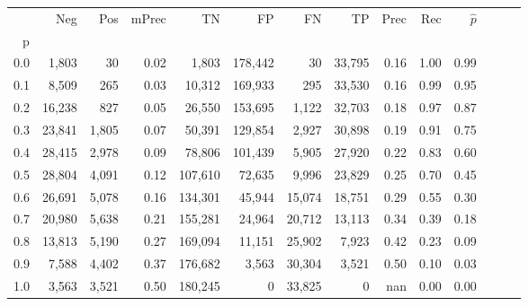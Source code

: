 \begin{tabular}{rrrrrrrrrrrrrr}
\toprule
{} &     Neg &    Pos & mPrec &       TN &       FP &      FN &      TP &  Prec &   Rec & $\hat{p}$ \\
p   &         &        &       &          &          &         &         &       &       &           \\
\midrule
0.0 &   1,803 &     30 &  0.02 &    1,803 &  178,442 &      30 &  33,795 &  0.16 &  1.00 &      0.99 \\
0.1 &   8,509 &    265 &  0.03 &   10,312 &  169,933 &     295 &  33,530 &  0.16 &  0.99 &      0.95 \\
0.2 &  16,238 &    827 &  0.05 &   26,550 &  153,695 &   1,122 &  32,703 &  0.18 &  0.97 &      0.87 \\
0.3 &  23,841 &  1,805 &  0.07 &   50,391 &  129,854 &   2,927 &  30,898 &  0.19 &  0.91 &      0.75 \\
0.4 &  28,415 &  2,978 &  0.09 &   78,806 &  101,439 &   5,905 &  27,920 &  0.22 &  0.83 &      0.60 \\
0.5 &  28,804 &  4,091 &  0.12 &  107,610 &   72,635 &   9,996 &  23,829 &  0.25 &  0.70 &      0.45 \\
0.6 &  26,691 &  5,078 &  0.16 &  134,301 &   45,944 &  15,074 &  18,751 &  0.29 &  0.55 &      0.30 \\
0.7 &  20,980 &  5,638 &  0.21 &  155,281 &   24,964 &  20,712 &  13,113 &  0.34 &  0.39 &      0.18 \\
0.8 &  13,813 &  5,190 &  0.27 &  169,094 &   11,151 &  25,902 &   7,923 &  0.42 &  0.23 &      0.09 \\
0.9 &   7,588 &  4,402 &  0.37 &  176,682 &    3,563 &  30,304 &   3,521 &  0.50 &  0.10 &      0.03 \\
1.0 &   3,563 &  3,521 &  0.50 &  180,245 &        0 &  33,825 &       0 &   nan &  0.00 &      0.00 \\
\bottomrule
\end{tabular}
